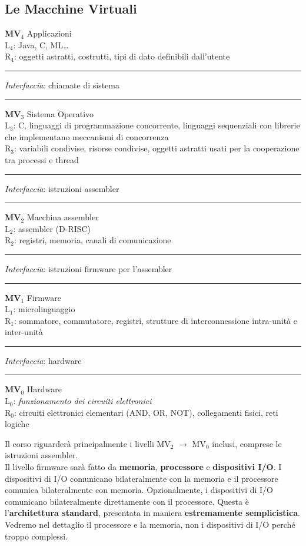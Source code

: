 \documentclass[10pt]{report}
\begin{document}
\subsection{Le Macchine Virtuali}
\begin{list}{}{}
\item \textbf{MV$_{4}$} Applicazioni\\L$_{4}$: Java, C, ML\ldots\\R$_{4}$: oggetti astratti, costrutti, tipi di dato definibili dall'utente
\item \rule{5cm}{1pt} \textit{Interfaccia}: chiamate di sistema \rule{5cm}{1pt}
\item \textbf{MV$_{3}$} Sistema Operativo\\L$_{3}$: C, linguaggi di programmazione concorrente, linguaggi sequenziali con librerie che implementano meccanismi di concorrenza\\R$_{3}$: variabili condivise, risorse condivise, oggetti astratti usati per la cooperazione tra processi e thread
\item \rule{5cm}{1pt} \textit{Interfaccia}: istruzioni assembler \rule{5cm}{1pt}
\item \textbf{MV$_{2}$} Macchina assembler\\L$_{2}$: assembler (D-RISC)\\R$_{2}$: registri, memoria, canali di comunicazione
\item \rule{5cm}{1pt} \textit{Interfaccia}: istruzioni firmware per l'assembler \rule{2.8cm}{1pt}
\item \textbf{MV$_{1}$} Firmware\\L$_{1}$: microlinguaggio\\R$_{1}$: sommatore, commutatore, registri, strutture di interconnessione intra-unità e inter-unità
\item \rule{5cm}{1pt} \textit{Interfaccia}: hardware \rule{6.7cm}{1pt}
\item \textbf{MV$_{0}$} Hardware\\L$_{0}$: \textit{funzionamento dei circuiti elettronici}\\R$_{0}$: circuiti elettronici elementari (AND, OR, NOT), collegamenti fisici, reti logiche
\end{list}
Il corso riguarderà principalmente i livelli MV$_{2}$ $\rightarrow$ MV$_{0}$ inclusi, comprese le istruzioni assembler.\\
Il livello firmware sarà fatto da \textbf{memoria}, \textbf{processore} e \textbf{dispositivi I/O}. I dispositivi di I/O comunicano bilateralmente con la memoria e il processore comunica bilateralmente con memoria. Opzionalmente, i dispositivi di I/O comunicano bilateralmente direttamente con il processore. Questa è l'\textbf{architettura standard}, presentata in maniera \textbf{estremamente semplicistica}.\\
Vedremo nel dettaglio il processore e la memoria, non i dispositivi di I/O perché troppo complessi.
\pagebreak
\end{document}
